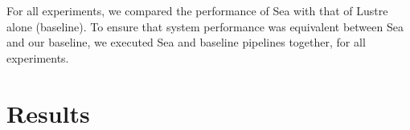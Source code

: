     For all experiments, we compared the performance of Sea with that of Lustre alone (baseline).
    To ensure that system performance was equivalent between Sea and our baseline,
    we executed Sea and baseline pipelines together, for all experiments.
    
    \section{Results}



